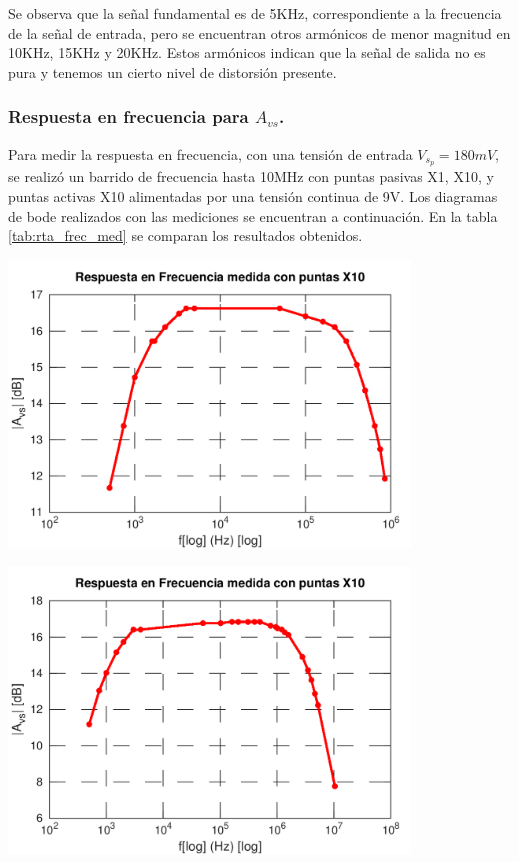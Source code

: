 \documentclass[a4paper, 10pt, spanish]{article}
\begin{document}
Se observa que la señal fundamental es de 5KHz, correspondiente a la frecuencia de la señal de entrada, pero se encuentran otros armónicos de menor magnitud en 10KHz, 15KHz y 20KHz. Estos armónicos indican que la señal de salida no es pura y tenemos un cierto nivel de distorsión presente.

\subsubsection{Respuesta en frecuencia para $A_{vs}$.}
Para medir la respuesta en frecuencia, con una tensión de entrada $V_{s_p}=180mV$, se realizó un barrido de frecuencia hasta 10MHz con puntas pasivas X1, X10, y puntas activas X10 alimentadas por una tensión continua de 9V. Los diagramas de bode realizados con las mediciones se encuentran a continuación. En la tabla \ref{tab:rta_frec_med} se comparan los resultados obtenidos.

\begin{center}
  \includegraphics[width=0.8\textwidth]{X1.png}
  \label{fig:X1_med}
\end{center}

\begin{center}
  \includegraphics[width=0.8\textwidth]{X10.png}
  \label{fig:X10_med}
\end{center}
\end{document}
